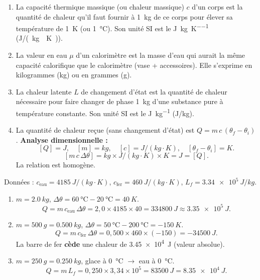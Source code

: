 \documentclass[11pt]{article}
\newcommand{\cle}[1]{{\popxbold\color{popdark}#1}}
\begin{document}
\begin{corrige}
\begin{enumerate}
\item La \cle{capacité thermique massique} (ou \cle{chaleur massique}) $c$ d'un corps est la quantité de chaleur qu'il faut fournir à \SI{1}{kg} de ce corps pour élever sa température de \SI{1}{K} (ou \SI{1}{\degreeCelsius}). Son unité SI est le \si{\joule\per\kilogram\per\kelvin} (\si{J/(kg\cdot K)}).
\item La \cle{valeur en eau} $\mu$ d'un calorimètre est la masse d'eau qui aurait la même capacité calorifique que le calorimètre (vase + accessoires). Elle s'exprime en kilogrammes (\si{kg}) ou en grammes (\si{g}).
\item La \cle{chaleur latente} $L$ de changement d'état est la quantité de chaleur nécessaire pour faire changer de phase \SI{1}{kg} d'une substance pure à température constante. Son unité SI est le \si{\joule\per\kilogram} (\si{J/kg}).
\item La quantité de chaleur reçue (sans changement d'état) est $Q = m\,c\,(\theta_f - \theta_i)$.
  \textbf{Analyse dimensionnelle :}
  \[
  [Q] = \si{J},\quad [m] = \si{kg},\quad [c] = \si{J/(kg\cdot K)},\quad [\theta_f-\theta_i] = \si{K}.
  \]
  \[
  [m\,c\,\Delta\theta] = \si{kg} \times \si{J/(kg\cdot K)} \times \si{K} = \si{J} = [Q].
  \]
  La relation est homogène.
\end{enumerate}
\end{corrige}

\begin{corrige}
Données : $c_{\text{eau}} = \SI{4185}{J/(kg\cdot K)}$, $c_{\text{fer}} = \SI{460}{J/(kg\cdot K)}$, $L_f = \SI{3,34e5}{J/kg}$.
\begin{enumerate}
\item $m = \SI{2,0}{kg}$, $\Delta\theta = \SI{60}{\degreeCelsius} - \SI{20}{\degreeCelsius} = \SI{40}{K}$.
  \[
  Q = m\,c_{\text{eau}}\,\Delta\theta = 2,0 \times 4185 \times 40 = \SI{334800}{J} \approx \SI{3,35e5}{J}.
  \]
\item $m = \SI{500}{g} = \SI{0,500}{kg}$, $\Delta\theta = \SI{50}{\degreeCelsius} - \SI{200}{\degreeCelsius} = -\SI{150}{K}$.
  \[
  Q = m\,c_{\text{fer}}\,\Delta\theta = 0,500 \times 460 \times (-150) = -\SI{34500}{J}.
  \]
  La barre de fer \textbf{cède} une chaleur de \SI{3,45e4}{J} (valeur absolue).
\item $m = \SI{250}{g} = \SI{0,250}{kg}$, glace à \SI{0}{\degreeCelsius} $\rightarrow$ eau à \SI{0}{\degreeCelsius}.
  \[
  Q = m\,L_f = 0,250 \times 3,34 \times 10^5 = \SI{83500}{J} = \SI{8,35e4}{J}.
  \]
\end{enumerate}
\end{corrige}
\end{document}
